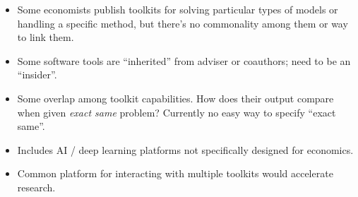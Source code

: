 \documentclass[12pt,pdftex,letterpaper]{article}
\begin{document}
\begin{itemize}
	\item Some economists publish toolkits for solving particular types of models or handling a specific method, but there's no commonality among them or way to link them.
	
	\item Some software tools are ``inherited'' from adviser or coauthors; need to be an ``insider''.
	
	\item Some overlap among toolkit capabilities. How does their output compare when given \textit{exact same} problem? Currently no easy way to specify ``exact same''.
	
	\item Includes AI / deep learning platforms not specifically designed for economics.
	
	\item Common platform for interacting with multiple toolkits would accelerate research.
\end{itemize}
\end{document}
